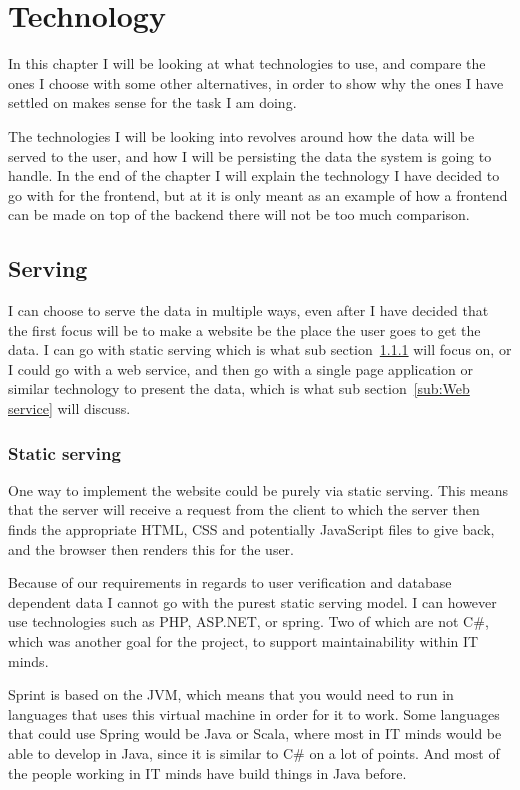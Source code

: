 \chapter{Technology}
\label{chap:Technology}
In this chapter I will be looking at what technologies to use, and compare the ones I choose with some other alternatives, in order to show why the ones I have settled on makes sense for the task I am doing.

The technologies I will be looking into revolves around how the data will be served to the user, and how I will be persisting the data the system is going to handle. In the end of the chapter I will explain the technology I have decided to go with for the frontend, but at it is only meant as an example of how a frontend can be made on top of the backend there will not be too much comparison.

\section{Serving}
\label{sec:Serving}
I can choose to serve the data in multiple ways, even after I have decided that the first focus will be to make a website be the place the user goes to get the data. I can go with static serving which is what sub section~\ref{sub:Static serving} will focus on, or I could go with a web service, and then go with a single page application or similar technology to present the data, which is what sub section~\ref{sub:Web service} will discuss.

\subsection{Static serving}
\label{sub:Static serving}

One way to implement the website could be purely via static serving. This means that the server will receive a request from the client to which the server then finds the appropriate HTML, CSS and potentially JavaScript files to give back, and the browser then renders this for the user.

Because of our requirements in regards to user verification and database dependent data I cannot go with the purest static serving model. I can however use technologies such as PHP, ASP.NET, or spring. Two of which are not C\#, which was another goal for the project, to support maintainability within IT minds.

Sprint is based on the JVM\cite{spring-framework}, which means that you would need to run in languages that uses this virtual machine in order for it to work. Some languages that could use Spring would be Java or Scala, where most in IT minds would be able to develop in Java, since it is similar to C\# on a lot of points. And most of the people working in IT minds have build things in Java before.

